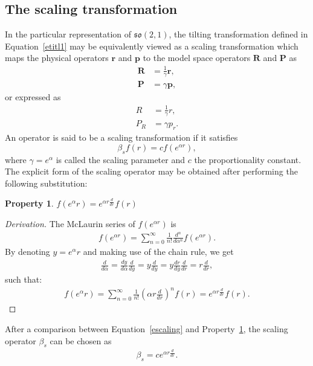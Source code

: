 \documentclass[12pt,a4paper]{report}
\newtheorem{property}{Property}[section]
\theoremstyle{definition}
\newenvironment{derivation}
  {\renewcommand\qedsymbol{$\square$}\begin{proof}[Derivation]}
  {\end{proof}}
\theoremstyle{remark}
\theoremstyle{remark}
\begin{document}
\begin{appendices}
\section{The scaling transformation}\label{scaling}
In the particular representation of $\mathfrak{so}(2,1)$, the tilting transformation defined in Equation~\ref{etitl1} may be equivalently viewed as a scaling transformation which maps the physical operators $\textbf{r}$ and $\textbf{p}$ to the model space operators $\textbf{R}$ and $\textbf{P}$ as
\begin{align*}
\textbf{R}&=\frac{1}{\gamma}\textbf{r},\\
\textbf{P}&=\gamma\textbf{p},
\end{align*}
or expressed as
\begin{align*}
R&=\frac{1}{\gamma}r,\\
P_R&=\gamma p_r .
\end{align*}
An operator is said to be a scaling transformation if it satisfies
\begin{equation}\label{escaling}
\beta_s f(r)=cf(e^{\alpha r}),
\end{equation}
where $\gamma=e^\alpha$ is called the scaling parameter and $c$ the proportionality constant. The explicit form of the scaling operator may be obtained after performing the following substitution:
\begin{property}\label{pscaling}
$f(e^\alpha r)=e^{\alpha r\frac{d}{dr}}f(r)$
\end{property}
\begin{derivation}
The McLaurin series of $f(e^{\alpha r})$ is
\begin{align*}
f(e^{\alpha r})=\sum_{n=0}^{\infty}\frac{1}{n!}\frac{d^n}{d\alpha^n}f(e^{\alpha r}).
\end{align*}
By denoting $y=e^\alpha r$ and making use of the chain rule, we get
\begin{align*}
\frac{d}{d\alpha}=\frac{dy}{d\alpha}\frac{d}{dy}=y\frac{d}{dy}=y\frac{dr}{dy}\frac{d}{dr}=r\frac{d}{dr},
\end{align*}
such that:
\begin{align*}
f(e^\alpha r)=\sum_{n=0}^{\infty}\frac{1}{n!}\left(\alpha r\frac{d}{dr}\right)^n f(r)=e^{\alpha r\frac{d}{dr}}f(r).
\end{align*}
\end{derivation}
After a comparison between Equation~\ref{escaling} and Property~\ref{pscaling}, the scaling operator $\beta_s$ can be chosen as
\begin{align*}
\beta_s=ce^{\alpha r\frac{d}{dr}}.

\end{align*}
\end{appendices}
\end{document}
